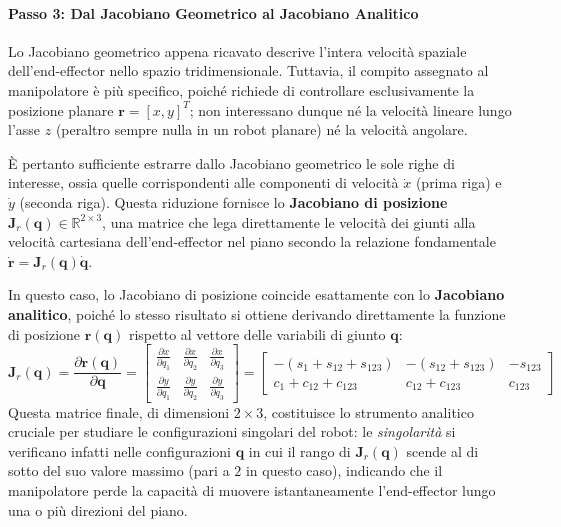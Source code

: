 \documentclass[11pt, a4paper]{report}
\begin{document}
\paragraph{Passo 3: Dal Jacobiano Geometrico al Jacobiano Analitico}
Lo Jacobiano geometrico appena ricavato descrive l'intera velocità spaziale dell'end-effector nello spazio tridimensionale. Tuttavia, il compito assegnato al manipolatore è più specifico, poiché richiede di controllare esclusivamente la posizione planare $\bm{r} = [x, y]^T$; non interessano dunque né la velocità lineare lungo l'asse $z$ (peraltro sempre nulla in un robot planare) né la velocità angolare.

È pertanto sufficiente estrarre dallo Jacobiano geometrico le sole righe di interesse, ossia quelle corrispondenti alle componenti di velocità $\dot{x}$ (prima riga) e $\dot{y}$ (seconda riga). Questa riduzione fornisce lo \textbf{Jacobiano di posizione} $\bm{J}_r(\bm{q}) \in \mathbb{R}^{2 \times 3}$, una matrice che lega direttamente le velocità dei giunti alla velocità cartesiana dell'end-effector nel piano secondo la relazione fondamentale $\dot{\bm{r}} = \bm{J}_r(\bm{q})\dot{\bm{q}}$.

In questo caso, lo Jacobiano di posizione coincide esattamente con lo \textbf{Jacobiano analitico}, poiché lo stesso risultato si ottiene derivando direttamente la funzione di posizione $\bm{r}(\bm{q})$ rispetto al vettore delle variabili di giunto $\bm{q}$:
\[
    \bm{J}_r(\bm{q}) = \frac{\partial \bm{r}(\bm{q})}{\partial \bm{q}} =
    \begin{bmatrix}
        \frac{\partial x}{\partial q_1} & \frac{\partial x}{\partial q_2} & \frac{\partial x}{\partial q_3} \\
        \frac{\partial y}{\partial q_1} & \frac{\partial y}{\partial q_2} & \frac{\partial y}{\partial q_3}
    \end{bmatrix}
    =
    \begin{bmatrix}
        -(s_{1} + s_{12} + s_{123}) & -(s_{12} + s_{123}) & -s_{123} \\
        c_{1} + c_{12} + c_{123} & c_{12} + c_{123} & c_{123}
    \end{bmatrix}
\]
Questa matrice finale, di dimensioni $2 \times 3$, costituisce lo strumento analitico cruciale per studiare le configurazioni singolari del robot: le \textit{singolarità} si verificano infatti nelle configurazioni $\bm{q}$ in cui il rango di $\bm{J}_r(\bm{q})$ scende al di sotto del suo valore massimo (pari a $2$ in questo caso), indicando che il manipolatore perde la capacità di muovere istantaneamente l'end-effector lungo una o più direzioni del piano.
\end{document}
